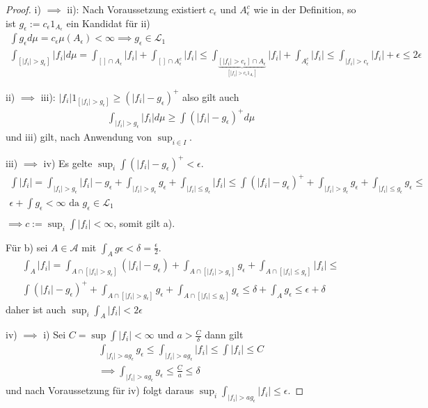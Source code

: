 \documentclass[]{article}
\begin{document}
\begin{proof}
	i) $\implies$ ii): Nach Voraussetzung existiert $c_\epsilon$ und $A_\epsilon^c$ wie in der Definition, so ist $g_\epsilon:= c_\epsilon 1_{A_\epsilon}$ ein Kandidat für ii)
	\begin{align*}
		\int g_\epsilon d\mu = c_\epsilon \mu(A_\epsilon) < \infty \implies g_\epsilon \in \mathcal{L}_1\\
		\int_{[|f_i|>g_\epsilon]} |f_i| d\mu = \int_{[]\cap A_\epsilon} |f_i| + \int_{[]\cap A_\epsilon^c} |f_i| \leq \int_{\underbrace{[|f_i|>c_\epsilon] \cap A_\epsilon}_{[|f_i|>c_\epsilon 1_{A_\epsilon}]}} |f_i| + \int_{A_\epsilon^c} |f_i| \leq \int_{|f_i|>c_\epsilon} |f_i| + \epsilon \leq 2\epsilon
	\end{align*}
	
	ii) $\implies$ iii): $|f_i|1_{[|f_i|>g_\epsilon]} \geq (|f_i|-g_\epsilon)^+$ also gilt auch
	\begin{align*}
		\int_{|f_i|>g_\epsilon} |f_i| d\mu \geq \int (|f_i| - g_\epsilon)^+ d\mu
	\end{align*}
	und iii) gilt, nach Anwendung von $\sup_{i\in I}$.
	
	iii) $\implies$ iv) Es gelte $\sup_i \int (|f_i|-g_\epsilon)^+ < \epsilon$.
	\begin{align*}
		\int |f_i| = \int_{|f_i|>g_\epsilon} |f_i| - g_\epsilon + \int_{|f_i| > g_\epsilon} g_\epsilon + \int_{|f_i|\leq g_\epsilon}|f_i| \leq \int(|f_i|-g_\epsilon)^+ + \int_{|f_i|>g_\epsilon} g_\epsilon + \int_{|f_i|\leq g_\epsilon} g_\epsilon \leq\\
		\epsilon + \int g_\epsilon < \infty \text{ da } g_\epsilon \in \mathcal{L}_1\\
	\end{align*}
	$\implies c:=\sup_i \int|f_i| < \infty$, somit gilt a).
	
	Für b) sei $A \in \mathcal{A}$ mit $\int_A g\epsilon < \delta = \frac{\epsilon}{2}$.
	\begin{align*}
		\int_A |f_i| = \int_{A\cap[|f_i|>g_\epsilon]}(|f_i|-g_\epsilon) + \int_{A\cap[|f_i|>g_\epsilon]}g_\epsilon + \int_{A\cap[|f_i|\leq g_\epsilon]}|f_i| \leq \\
		\int (|f_i| - g_\epsilon)^+ + \int_{A\cap[|f_i|>g_\epsilon]} g_\epsilon + \int_{A\cap[|f_i| \leq g_\epsilon]} g_\epsilon \leq \delta + \int_A g_\epsilon \leq \epsilon + \delta
	\end{align*}
	daher ist auch $\sup_i \int_A |f_i| < 2 \epsilon$
	
	iv) $\implies$ i) Sei $C=\sup \int |f_i| < \infty$ und $a > \frac{C}{\delta}$ dann gilt
	\begin{align*}
		\int_{|f_i|>a g_\epsilon} g_\epsilon \leq \int_{|f_i|>a g_\epsilon} |f_i| \leq \int |f_i| \leq C\\
		\implies \int_{|f_i| > a g_\epsilon} g_\epsilon \leq \frac{C}{a} \leq \delta
	\end{align*}
	und nach Voraussetzung für iv) folgt daraus $\sup_i \int_{|f_i| > a g_\epsilon} |f_i| \leq \epsilon$.
	

\end{proof}
\end{document}
